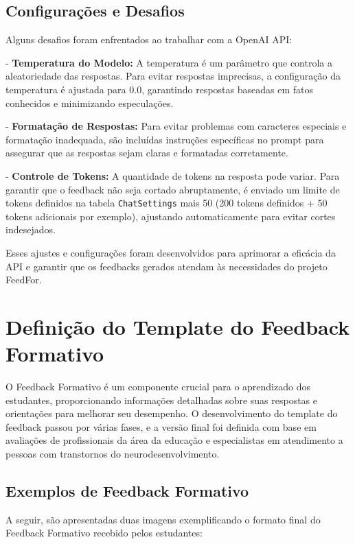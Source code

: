 \subsection{Configurações e Desafios}

Alguns desafios foram enfrentados ao trabalhar com a OpenAI API:

- \textbf{Temperatura do Modelo:} A temperatura é um parâmetro que controla a aleatoriedade das respostas. Para evitar respostas imprecisas, a configuração da temperatura é ajustada para 0.0, garantindo respostas baseadas em fatos conhecidos e minimizando especulações.

- \textbf{Formatação de Respostas:} Para evitar problemas com caracteres especiais e formatação inadequada, são incluídas instruções específicas no prompt para assegurar que as respostas sejam claras e formatadas corretamente.

- \textbf{Controle de Tokens:} A quantidade de tokens na resposta pode variar. Para garantir que o feedback não seja cortado abruptamente, é enviado um limite de tokens definidos na tabela \texttt{ChatSettings} mais 50 (200 tokens definidos + 50 tokens adicionais por exemplo), ajustando automaticamente para evitar cortes indesejados.

Esses ajustes e configurações foram desenvolvidos para aprimorar a eficácia da API e garantir que os feedbacks gerados atendam às necessidades do projeto FeedFor.

\section{Definição do Template do Feedback Formativo}

O Feedback Formativo é um componente crucial para o aprendizado dos estudantes, proporcionando informações detalhadas sobre suas respostas e orientações para melhorar seu desempenho. O desenvolvimento do template do feedback passou por várias fases, e a versão final foi definida com base em avaliações de profissionais da área da educação e especialistas em atendimento a pessoas com transtornos do neurodesenvolvimento.

\subsection{Exemplos de Feedback Formativo}

A seguir, são apresentadas duas imagens exemplificando o formato final do Feedback Formativo recebido pelos estudantes:


